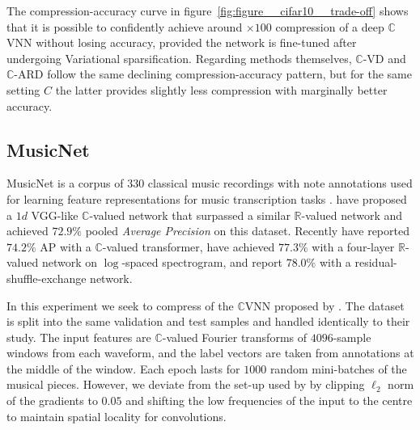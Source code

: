 \documentclass[a4paper,10pt,twocolumn]{article}
\newcommand{\real}{\mathbb{R}}
\newcommand{\cplx}{\mathbb{C}}
\begin{document}
The compression-accuracy curve in figure~\ref{fig:figure__cifar10__trade-off} shows that
it is possible to confidently achieve around $\times100$ compression of a deep $\cplx$VNN
without losing accuracy, provided the network is fine-tuned after undergoing Variational
sparsification. Regarding methods themselves, $\cplx$-VD and $\cplx$-ARD follow the same
declining compression-accuracy pattern, but for the same setting $C$ the latter provides
slightly less compression with marginally better accuracy.



\subsection{MusicNet} %
\label{sub:musicnet}



MusicNet is a corpus of $330$ classical music recordings with note annotations used for
learning feature representations for music transcription tasks \citep{thickstun_learning_2017}.
\citet{trabelsi_deep_2018} have proposed a $1d$ VGG-like $\cplx$-valued network that
surpassed a similar $\real$-valued network and achieved $72.9\%$ pooled \emph{Average
Precision} on this dataset. Recently \citet{yang_complex_2019} have reported $74.2\%$
AP with a $\cplx$-valued transformer, \citet{thickstun_invariances_2018} have achieved
$77.3\%$ with a four-layer $\real$-valued network on $\log$-spaced spectrogram, and
\citet{draguns_residual_2020} report $78.0\%$ with a residual-shuffle-exchange network.

In this experiment we seek to compress of the $\cplx$VNN proposed by \citet{trabelsi_deep_2018}.
%
The dataset is split into the same validation and test samples and handled identically
to their study. The input features are $\cplx$-valued Fourier transforms of $4096$-sample
windows from each waveform, and the label vectors are taken from annotations at the middle
of the window. Each epoch lasts for $1000$ random mini-batches of the musical pieces.
% 
However, we deviate from the set-up used by \citet{trabelsi_deep_2018} by clipping $\ell_2$
norm of the gradients to $0.05$ and shifting the low frequencies of the input to the centre
to maintain spatial locality for convolutions.
\end{document}
